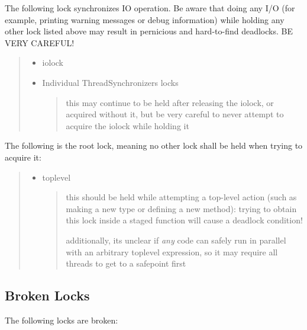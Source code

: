 The following lock synchronizes IO operation. Be aware that doing any I/O (for example, printing warning messages or debug information) while holding any other lock listed above may result in pernicious and hard-to-find deadlocks. BE VERY CAREFUL!



\begin{quote}
\begin{itemize}
\item iolock


\item Individual ThreadSynchronizers locks

\begin{quote}
this may continue to be held after releasing the iolock, or acquired without it, but be very careful to never attempt to acquire the iolock while holding it

\end{quote}
\end{itemize}
\end{quote}


The following is the root lock, meaning no other lock shall be held when trying to acquire it:



\begin{quote}
\begin{itemize}
\item toplevel

\begin{quote}
this should be held while attempting a top-level action (such as making a new type or defining a new method): trying to obtain this lock inside a staged function will cause a deadlock condition!

additionally, it{\textquotesingle}s unclear if \emph{any} code can safely run in parallel with an arbitrary toplevel expression, so it may require all threads to get to a safepoint first

\end{quote}
\end{itemize}
\end{quote}


\hypertarget{9065842407229995149}{}


\subsection{Broken Locks}



The following locks are broken:



